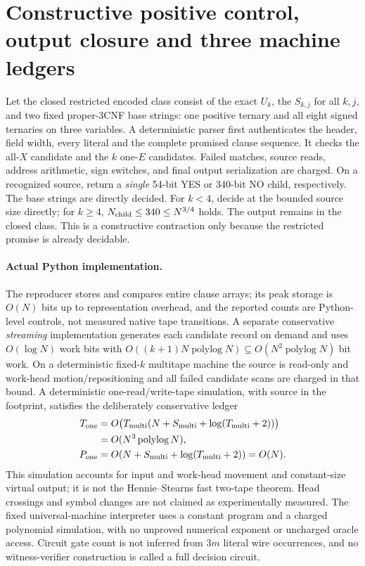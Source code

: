 \documentclass[11pt]{article}
\begin{document}
\section{Constructive positive control, output closure and three machine ledgers}
Let the closed restricted encoded class consist of the exact $U_k$, the $S_{k,j}$ for all $k,j$, and two fixed proper-3CNF base strings: one positive ternary and all eight signed ternaries on three variables. A deterministic parser first authenticates the header, field width, every literal and the complete promised clause sequence. It checks the all-$X$ candidate and the $k$ one-$E$ candidates. Failed matches, source reads, address arithmetic, sign switches, and final output serialization are charged. On a recognized source, return a \emph{single} 54-bit YES or 340-bit NO child, respectively. The base strings are directly decided. For $k<4$, decide at the bounded source size directly; for $k\ge4$, $N_{\rm child}\le340\le N^{3/4}$ holds. The output remains in the closed class. This is a constructive contraction only because the restricted promise is already decidable.

\paragraph{Actual Python implementation.} The reproducer stores and compares entire clause arrays; its peak storage is $O(N)$ bits up to representation overhead, and the reported counts are Python-level controls, not measured native tape transitions. A separate conservative \emph{streaming} implementation generates each candidate record on demand and uses $O(\log N)$ work bits with $O((k+1)N\operatorname{polylog}N)\subseteq O(N^2\operatorname{polylog}N)$ bit work. On a deterministic fixed-$k$ multitape machine the source is read-only and work-head motion/repositioning and all failed candidate scans are charged in that bound. A deterministic one-read/write-tape simulation, with source in the footprint, satisfies the deliberately conservative ledger
\[
\begin{aligned}
T_{\rm one}&=O\bigl(T_{\rm multi}(N+S_{\rm multi}+\log(T_{\rm multi}+2))\bigr)\\
&=O(N^3\operatorname{polylog}N),\\
P_{\rm one}&=O(N+S_{\rm multi}+\log(T_{\rm multi}+2))=O(N).
\end{aligned}
\]
This simulation accounts for input and work-head movement and constant-size virtual output; it is not the Hennie--Stearns fast two-tape theorem. Head crossings and symbol changes are not claimed as experimentally measured. The fixed universal-machine interpreter uses a constant program and a charged polynomial simulation, with no unproved numerical exponent or uncharged oracle access. Circuit gate count is not inferred from $3m$ literal wire occurrences, and no witness-verifier construction is called a full decision circuit.
\end{document}
